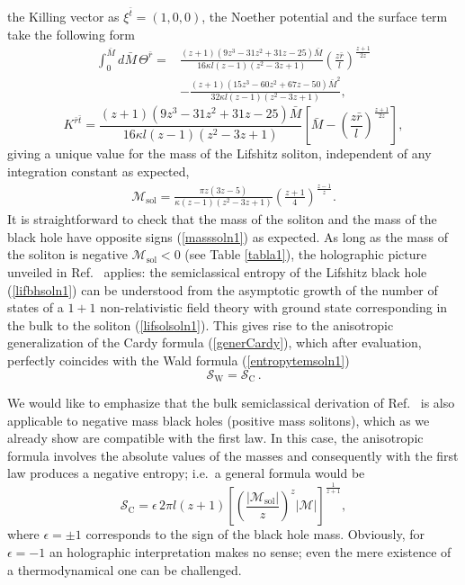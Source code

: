 \documentclass[prd,twocolumn,superscriptaddress,amsmath,amssymb,nofootinbib]{revtex4-1}
\begin{document}
the Killing vector as $\xi^{\bar{t}}=(1,0,0)$, the Noether
potential and the surface term take the following form {\small
\begin{align}
\int_{0}^{\bar{M}}\!\!\!\!d\bar{M}\,\Theta^{\bar{r}}={}&
\frac{(z+1)(9z^3-31z^2+31z-25)\bar{M}}{16{\kappa}l(z-1)(z^2-3z+1)}
\left(\frac{z\bar{r}}{l}\right)^{\frac{z+1}{2z}}\nonumber\\
&-\frac{(z+1)(15z^3-60z^2+67z-50)\bar{M}^2}{32{\kappa}l(z-1)(z^2-3z+1)},
\nonumber
\end{align}
\begin{equation}
K^{\bar{r}\bar{t}}=\frac{(z+1)(9z^3-31z^2+31z-25)\bar{M}}
{16{\kappa}l(z-1)(z^2-3z+1)}
\left[\bar{M}-\left(\frac{z\bar{r}}{l}\right)^{\frac{z+1}{2z}}\right],
\nonumber
\end{equation}}%
giving a unique value for the mass of the Lifshitz soliton,
independent of any integration constant as expected,
\begin{eqnarray}\label{massolsol1}
\mathcal{M}_{\mathrm{sol}}=\frac{{\pi}z(3z-5)}{\kappa(z-1)(z^2-3z+1)}
\left(\frac{z+1}{4}\right)^{\frac{z-1}{z}}.
\end{eqnarray}
It is straightforward to check that the mass of the soliton
and the mass of the black hole have opposite signs
(\ref{masssoln1}) as expected. As long as the mass of the
soliton is negative $\mathcal{M}_{\mathrm{sol}}<0$ (see Table
\ref{tabla1}), the holographic picture unveiled in
Ref.~\cite{Gonzalez:2011nz} applies: the semiclassical entropy
of the Lifshitz black hole (\ref{lifbhsoln1}) can be understood
from the asymptotic growth of the number of states of a $1+1$
non-relativistic field theory with ground state corresponding
in the bulk to the soliton (\ref{lifsolsoln1}). This gives rise
to the anisotropic generalization of the Cardy formula
(\ref{generCardy}), which after evaluation, perfectly coincides
with the Wald formula (\ref{entropytemsoln1})
\begin{equation}
\mathcal{S}_{\mathrm{W}}=\mathcal{S}_{\mathrm{C}}\, .
\end{equation}

We would like to emphasize that the bulk semiclassical
derivation of Ref.~\cite{Gonzalez:2011nz} is also applicable to
negative mass black holes (positive mass solitons), which as we
already show are compatible with the first law. In this case,
the anisotropic formula involves the absolute values of the
masses and consequently with the first law produces a negative
entropy; i.e.\ a general formula would be
\begin{equation}\label{|Cardy|}
\mathcal{S}_{\mathrm{C}}=\epsilon\,2\pi{l}(z+1)\left[
\left(\frac{|\mathcal{M}_{\mathrm{sol}}|}{z}\right)^{z}|\mathcal{M}|\right]
^{\frac{1}{z+1}},
\end{equation}
where $\epsilon=\pm1$ corresponds to the sign of the black hole
mass. Obviously, for $\epsilon=-1$ an holographic
interpretation makes no sense; even the mere existence of a
thermodynamical one can be challenged.
\end{document}
